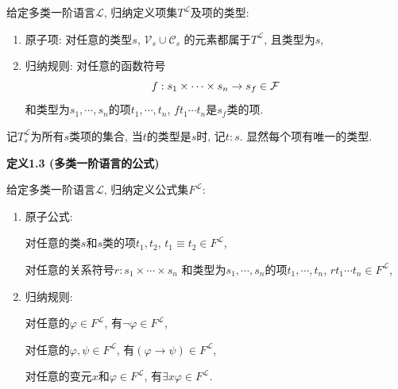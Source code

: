 \documentclass[UTF8]{ctexart}
\begin{document}
给定多类一阶语言$\mathcal{L}$,
归纳定义项集$T^{\mathcal{L}}$及项的类型:
\begin{enumerate}
    \item 原子项: 对任意的类型$s$, $\mathcal{V}_s\cup\mathcal{C}_s$
    的元素都属于$T^{\mathcal{L}}$, 且类型为$s$,
    \item 归纳规则: 对任意的函数符号
    \[
        f:s_1\times\cdots\times s_n\to s_f\in\mathcal{F}\\[-3pt]
    \]
    和类型为$s_1,\cdots,s_n$的项$t_1,\cdots,t_n$,
    $ft_1\cdots t_n$是$s_f$类的项.
\end{enumerate}

\vspace{10pt}

记$T^{\mathcal{L}}_s$为所有$s$类项的集合,
当$t$的类型是$s$时, 记$t:s$. 显然每个项有唯一的类型.

\vspace{10pt}

\hypertarget{sec:定义1.3}{}
\noindent\textbf{定义1.3 (多类一阶语言的公式)}

给定多类一阶语言$\mathcal{L}$, 归纳定义公式集$F^{\mathcal{L}}$:
\begin{enumerate}
    \item 原子公式:
    
    \hspace{3em}
    对任意的类$s$和$s$类的项$t_1,t_2$,
    $t_1\equiv t_2\in F^{\mathcal{L}}$,

    \hspace{3em}
    对任意的关系符号$r:s_1\times\cdots\times s_n$
    和类型为$s_1,\cdots,s_n$的项$t_1,\cdots,t_n$,
    $rt_1\cdots t_n\in F^{\mathcal{L}}$,

    \item 归纳规则:
    
    \hspace{3em}
    对任意的$\varphi\in F^{\mathcal{L}}$, 有$\neg\varphi\in F^{\mathcal{L}}$,

    \hspace{3em}
    对任意的$\varphi,\psi\in F^{\mathcal{L}}$,
    有$(\varphi\to\psi)\in F^{\mathcal{L}}$,

    \hspace{3em}
    对任意的变元$x$和$\varphi\in F^{\mathcal{L}}$,
    有$\exists x\varphi\in F^{\mathcal{L}}$.
\end{enumerate}





\newpage
\end{document}
